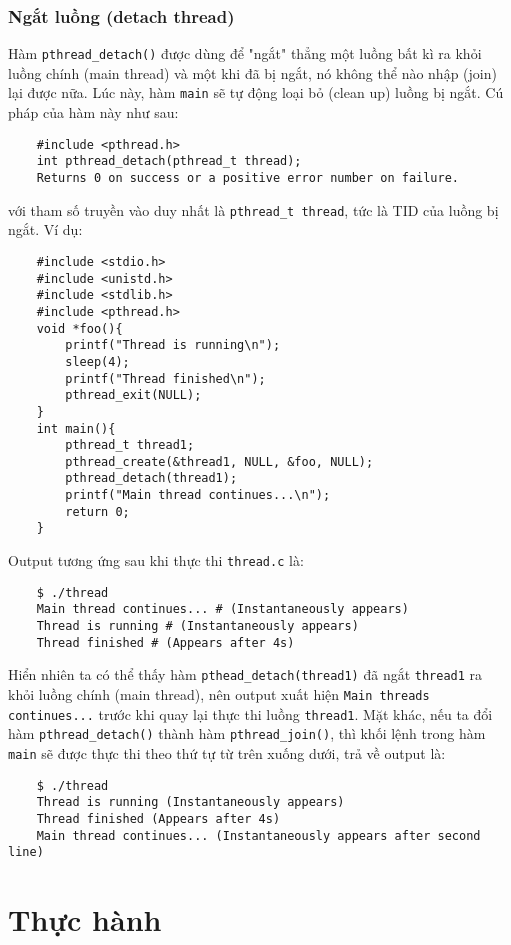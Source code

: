\documentclass{article}
\begin{document}
\subsubsection{Ngắt luồng (detach thread)}
Hàm \verb|pthread_detach()| được dùng để "ngắt" thẳng một luồng bất kì ra khỏi luồng chính (main thread) và một khi đã bị ngắt, nó không thể nào nhập (join) lại được nữa.
Lúc này, hàm \verb|main| sẽ tự động loại bỏ (clean up) luồng bị ngắt. Cú pháp của hàm này như sau:
\begin{verbatim}
    #include <pthread.h>
    int pthread_detach(pthread_t thread);
    Returns 0 on success or a positive error number on failure.
\end{verbatim}
với tham số truyền vào duy nhất là \verb|pthread_t thread|, tức là TID của luồng bị ngắt. Ví dụ:
\begin{verbatim}
    #include <stdio.h>
    #include <unistd.h>
    #include <stdlib.h>
    #include <pthread.h>
    void *foo(){
        printf("Thread is running\n");
        sleep(4);
        printf("Thread finished\n");
        pthread_exit(NULL);
    }
    int main(){
        pthread_t thread1;
        pthread_create(&thread1, NULL, &foo, NULL);
        pthread_detach(thread1);
        printf("Main thread continues...\n");
        return 0;
    }    
\end{verbatim}
Output tương ứng sau khi thực thi \verb|thread.c| là:
\begin{verbatim}
    $ ./thread
    Main thread continues... # (Instantaneously appears)
    Thread is running # (Instantaneously appears)
    Thread finished # (Appears after 4s)
\end{verbatim}
Hiển nhiên ta có thể thấy hàm \verb|pthead_detach(thread1)| đã ngắt \verb|thread1| ra khỏi luồng chính (main thread),
nên output xuất hiện \verb|Main threads continues...| trước khi quay lại thực thi luồng \verb|thread1|. Mặt khác, nếu
ta đổi hàm \verb|pthread_detach()| thành hàm \verb|pthread_join()|, thì khối lệnh trong hàm \verb|main| sẽ được thực thi
theo thứ tự từ trên xuống dưới, trả về output là:
\begin{verbatim}
    $ ./thread
    Thread is running (Instantaneously appears)
    Thread finished (Appears after 4s)
    Main thread continues... (Instantaneously appears after second line)
\end{verbatim}
\section{Thực hành}
\end{document}
